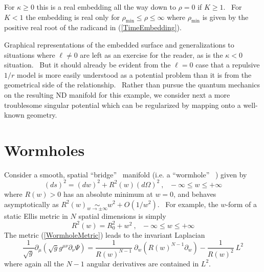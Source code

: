 \documentclass{article}%
\begin{document}
For $\kappa\geq0$ this is a real embedding all the way down to $\rho=0$ if
$K\geq1$. \ For $K<1$ the embedding is real only for $\rho_{\min}\leq\rho
\leq\infty$ where $\rho_{\min}$ is given by the positive real root of the
radicand in (\ref{TimeEmbedding}).

Graphical representations of the embedded surface and generalizations to
situations where $\ell\neq0$ are left as an exercise for the reader, as is the
$\kappa<0$ situation. \ But it should already be evident from the $\ell=0$
case that a repulsive $1/r$ model is more easily understood as a potential
problem than it is from the geometrical side of the relationship. \ Rather
than pursue the quantum mechanics on the resulting ND manifold for this
example, we consider next a more troublesome singular potential which can be
regularized by mapping onto a well-known geometry.

\section{Wormholes}

Consider a smooth, spatial \textquotedblleft bridge\textquotedblright%
\ manifold \cite{ER} (i.e. a \textquotedblleft wormhole\textquotedblright%
\ \cite{Thorne}) given by%
\begin{equation}
\left(  ds\right)  ^{2}=\left(  dw\right)  ^{2}+R^{2}\left(  w\right)  \left(
d\Omega\right)  ^{2}\ ,\ \ \ -\infty\leq w\leq+\infty\label{WormholeMetric}%
\end{equation}
where $R\left(  w\right)  >0$ has an absolute minimum at $w=0$, and behaves
asymptotically as $R^{2}\left(  w\right)  \underset{w\rightarrow\pm
\infty}{\sim}w^{2}+O\left(  1/w^{2}\right)  $. \ For example, the $w$-form of
a static Ellis metric \cite{Ellis} in $N$ spatial dimensions is simply
\begin{equation}
R^{2}\left(  w\right)  =R_{0}^{2}+w^{2}\ ,\ \ \ -\infty\leq w\leq
+\infty\label{Ellis}%
\end{equation}
The metric (\ref{WormholeMetric}) leads to the invariant Laplacian
\begin{equation}
\frac{1}{\sqrt{g}}\partial_{\mu}\left(  \sqrt{g}g^{\mu\nu}\partial_{\nu}%
\Psi\right)  =\frac{1}{R\left(  w\right)  ^{N-1}}~\partial_{w}\left(  R\left(
w\right)  ^{N-1}\partial_{w}\right)  -\frac{1}{R\left(  w\right)  ^{2}}~L^{2}%
\end{equation}
where again all the $N-1$ angular derivatives are contained in $L^{2}$. \ 
\end{document}
